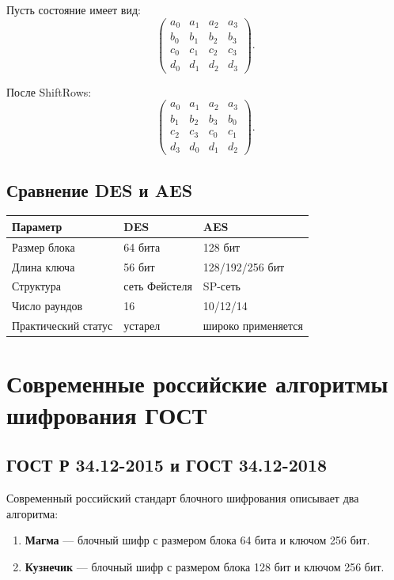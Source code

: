 \documentclass[12pt,a4paper]{article}
\begin{document}
Пусть состояние имеет вид:
\[
\begin{pmatrix}
a_0&a_1&a_2&a_3\\
b_0&b_1&b_2&b_3\\
c_0&c_1&c_2&c_3\\
d_0&d_1&d_2&d_3
\end{pmatrix}.
\]

После ShiftRows:
\[
\begin{pmatrix}
a_0&a_1&a_2&a_3\\
b_1&b_2&b_3&b_0\\
c_2&c_3&c_0&c_1\\
d_3&d_0&d_1&d_2
\end{pmatrix}.
\]

\subsection{Сравнение DES и AES}

\begin{center}
\begin{tabular}{lll}
\toprule
Параметр & DES & AES \\
\midrule
Размер блока & 64 бита & 128 бит \\
Длина ключа & 56 бит & 128/192/256 бит \\
Структура & сеть Фейстеля & SP-сеть \\
Число раундов & 16 & 10/12/14 \\
Практический статус & устарел & широко применяется \\
\bottomrule
\end{tabular}
\end{center}

\section{Современные российские алгоритмы шифрования ГОСТ}

\subsection{ГОСТ Р 34.12-2015 и ГОСТ 34.12-2018}

Современный российский стандарт блочного шифрования описывает два алгоритма:

\begin{enumerate}
    \item \textbf{Магма} --- блочный шифр с размером блока 64 бита и ключом 256 бит.
    \item \textbf{Кузнечик} --- блочный шифр с размером блока 128 бит и ключом 256 бит.
\end{enumerate}
\end{document}
